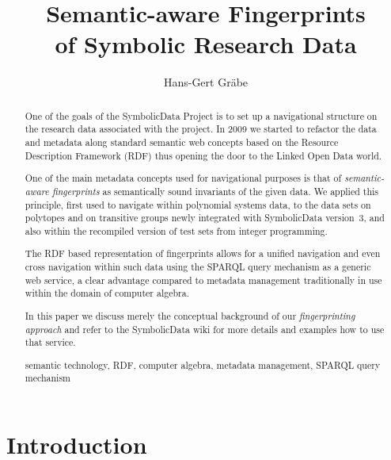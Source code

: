 \documentclass[runningheads,a4paper]{llncs}
\newcommand{\keywords}[1]{\par\addvspace\baselineskip
\noindent\keywordname\enspace\ignorespaces#1}
\newcommand{\SD}{{\sc Symbo\-lic\-Data}}
\begin{document}
\mainmatter


\title{Semantic-aware Fingerprints\\ of Symbolic Research Data}  %
\author{Hans-Gert Gr\"abe}
\maketitle

\begin{abstract}
One of the goals of the {\SD} Project is to set up a navigational structure on
the research data associated with the project. In 2009 we started to refactor
the data and metadata along standard semantic web concepts based on the
Resource Description Framework (RDF) thus opening the door to the Linked Open
Data world.

One of the main metadata concepts used for navigational purposes is that of
\emph{semantic-aware fingerprints} as semantically sound invariants of the
given data.  We applied this principle, first used to navigate within
polynomial systems data, to the data sets on polytopes and on transitive groups
newly integrated with {\SD} version~3, and also within the recompiled version
of test sets from integer programming.  

The RDF based representation of fingerprints allows for a unified navi\-gation
and even cross navigation within such data using the SPARQL query mechanism as
a generic web service, a clear advantage compared to metadata management
traditionally in use within the domain of computer algebra.

In this paper we discuss merely the conceptual background of our
\emph{fingerprinting approach} and refer to the {\SD} wiki for more details and
examples how to use that service.

\keywords{semantic technology, RDF, computer algebra, metadata management,
  SPARQL query mechanism}
\end{abstract}

\section{Introduction}
\end{document}

